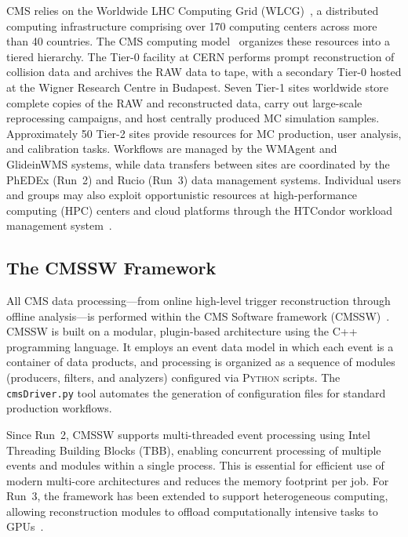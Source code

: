 CMS relies on the Worldwide LHC Computing Grid (WLCG)~\cite{WLCG:2005tdr}, a distributed computing infrastructure comprising over 170 computing centers across more than 40 countries. The CMS computing model~\cite{CMS:2005ctr} organizes these resources into a tiered hierarchy. The Tier-0 facility at CERN performs prompt reconstruction of collision data and archives the RAW data to tape, with a secondary Tier-0 hosted at the Wigner Research Centre in Budapest. Seven Tier-1 sites worldwide store complete copies of the RAW and reconstructed data, carry out large-scale reprocessing campaigns, and host centrally produced MC simulation samples. Approximately 50 Tier-2 sites provide resources for MC production, user analysis, and calibration tasks. Workflows are managed by the WMAgent and GlideinWMS systems, while data transfers between sites are coordinated by the PhEDEx (Run~2) and Rucio (Run~3) data management systems. Individual users and groups may also exploit opportunistic resources at high-performance computing (HPC) centers and cloud platforms through the HTCondor workload management system~\cite{Thain:2005condor}.

\subsection*{The CMSSW Framework}
\label{sec:cmssw}

All CMS data processing---from online high-level trigger reconstruction through offline analysis---is performed within the CMS Software framework (\textsc{CMSSW})~\cite{Jones:2015cmssw, CMS:2024run3dev}. \textsc{CMSSW} is built on a modular, plugin-based architecture using the \textsc{C++} programming language. It employs an event data model in which each event is a container of data products, and processing is organized as a sequence of modules (producers, filters, and analyzers) configured via \textsc{Python} scripts. The \texttt{cmsDriver.py} tool automates the generation of configuration files for standard production workflows.

Since Run~2, \textsc{CMSSW} supports multi-threaded event processing using Intel Threading Building Blocks (TBB), enabling concurrent processing of multiple events and modules within a single process. This is essential for efficient use of modern multi-core architectures and reduces the memory footprint per job. For Run~3, the framework has been extended to support heterogeneous computing, allowing reconstruction modules to offload computationally intensive tasks to GPUs~\cite{Bocci:2020hetero}.

